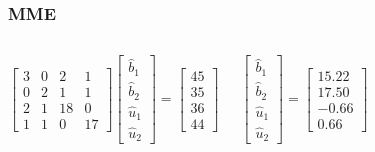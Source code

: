 \documentclass[serif,aspectratio=169]{beamer}
\begin{document}
\begin{frame}
\begin{columns}
\begin{frame}
  \frametitle{MME}
  \begin{columns}
    \begin{column}{.6\textwidth}
      $$
      \left[\begin{array}{rrrr}
          3 & 0 & 2 & 1\\
          0 & 2 & 1 & 1\\
          2 & 1 & 18 & 0\\
          1 & 1 & 0 & 17
        \end{array}\right]
      \left[\begin{array}{c}
          \hat{b}_1\\
          \hat{b}_2\\
          \hat{u}_1\\
          \hat{u}_2
        \end{array}\right]=
      \left[\begin{array}{c}
          45\\
          35\\
          36\\
          44
        \end{array}\right]
      $$

    \end{column}
    \pause
    \begin{column}{.4\textwidth}
      
      $$
      \left[\begin{array}{c}
          \hat{b}_1\\
          \hat{b}_2\\
          \hat{u}_1\\
          \hat{u}_2
        \end{array}\right]=
      \left[\begin{array}{r}
          15.22\\
          17.50\\
          -0.66\\
          0.66
        \end{array}\right]
      $$
      
    \end{column}
  \end{columns}
\end{frame}



\end{columns}
\end{frame}
\end{document}
